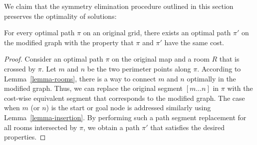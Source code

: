 We claim that the symmetry elimination procedure outlined in this section preserves the optimality of solutions:
\begin{theorem}
For every optimal path $\pi$ on an original grid, there exists an optimal path $\pi'$ on the modified graph with the property
that $\pi$ and $\pi'$ have the same cost.
\end{theorem}
\begin{proof}
Consider an optimal path $\pi$ on the original map and a room $R$ that is crossed by $\pi$.
Let $m$ and $n$ be the two perimeter points along $\pi$. According to Lemma~\ref{lemma-rooms},
there is a way to connect $m$ and $n$ optimally in the modified graph. Thus, we can replace the
original segment $[m \dots n]$ in $\pi$ with the cost-wise equivalent segment that corresponds to the modified graph.
The case when $m$ (or $n$) is the start or goal node is addressed similarly using Lemma~\ref{lemma-insertion}.
By performing such a path segment replacement for all rooms intersected by $\pi$, we obtain a path $\pi'$
that satisfies the desired properties.
\end{proof}


